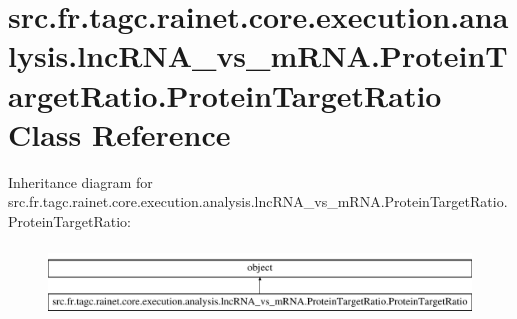 \hypertarget{classsrc_1_1fr_1_1tagc_1_1rainet_1_1core_1_1execution_1_1analysis_1_1lncRNA__vs__mRNA_1_1Proteina176ab8e17ed9f2c0909191b1bb30397}{\section{src.\-fr.\-tagc.\-rainet.\-core.\-execution.\-analysis.\-lnc\-R\-N\-A\-\_\-vs\-\_\-m\-R\-N\-A.\-Protein\-Target\-Ratio.\-Protein\-Target\-Ratio Class Reference}
\label{classsrc_1_1fr_1_1tagc_1_1rainet_1_1core_1_1execution_1_1analysis_1_1lncRNA__vs__mRNA_1_1Proteina176ab8e17ed9f2c0909191b1bb30397}
}
Inheritance diagram for src.\-fr.\-tagc.\-rainet.\-core.\-execution.\-analysis.\-lnc\-R\-N\-A\-\_\-vs\-\_\-m\-R\-N\-A.\-Protein\-Target\-Ratio.\-Protein\-Target\-Ratio\-:\begin{figure}[H]
\begin{center}
\leavevmode
\includegraphics[height=1.937716cm]{classsrc_1_1fr_1_1tagc_1_1rainet_1_1core_1_1execution_1_1analysis_1_1lncRNA__vs__mRNA_1_1Proteina176ab8e17ed9f2c0909191b1bb30397}
\end{center}
\end{figure}
